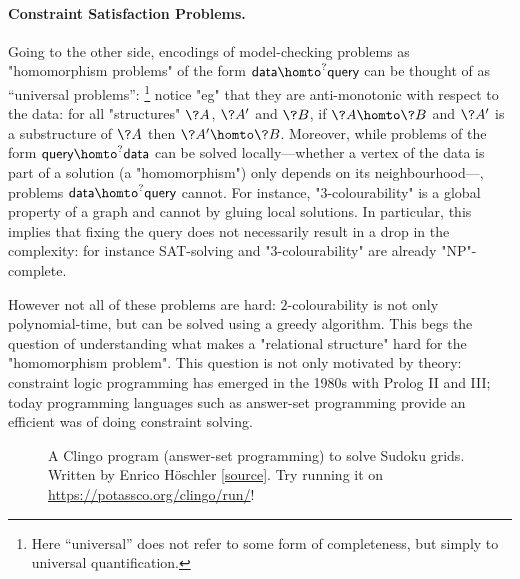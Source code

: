 \paragraph*{Constraint Satisfaction Problems.}
Going to the other side, encodings of model-checking problems
as "homomorphism problems" of the form $\textsf{data} \homto^? \textsf{query}$
can be thought of as ``universal problems'':%
\footnote{Here ``universal'' does not
refer to some form of completeness, but simply to universal quantification.}
notice "eg" that they are anti-monotonic with respect to the data:
for all "structures" $\?A$, $\?A'$ and $\?B$, if $\?A \homto \?B$ and $\?A'$ is a substructure
of $\?A$ then $\?A' \homto \?B$.
Moreover, while problems of the form $\textsf{query} \homto^? \textsf{data}$
can be solved locally---whether a vertex of the data is part of a solution (a "homomorphism") only 
depends on its neighbourhood---, problems $\textsf{data} \homto^? \textsf{query}$ cannot.
For instance, "3-colourability" is a global property of a graph and cannot by gluing local 
solutions. In particular, this implies that fixing the query does not necessarily result in
a drop in the complexity: for instance SAT-solving and "3-colourability" are already "NP"-complete.

However not all of these problems are hard: $2$-colourability is not only polynomial-time,
but can be solved using a greedy algorithm. This begs the question of understanding what
makes a "relational structure" hard for the "homomorphism problem".
This question is not only motivated by theory: constraint logic programming has emerged in the 1980s
with Prolog II and III; today programming languages such as answer-set programming provide an 
efficient was of doing constraint solving.

\begin{figure}
	\centering
	
	\caption{
		\AP\label{fig:ex-sudoku-asp}
		A Clingo program (answer-set programming) to solve Sudoku grids.
		Written by Enrico Höschler
		\href{https://ddmler.github.io/asp/2018/07/10/answer-set-programming-sudoku-solver.html}{[source]}.
		Try running it on \url{https://potassco.org/clingo/run/}!
	}
\end{figure}


